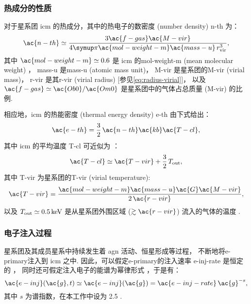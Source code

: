 \subsubsection{热成分的性质}

对于星系团 \ac{icm} 的热成分，其中的热电子的数密度 (number density) \ac{n-th} 为：
\begin{equation}
  \label{eq:n-th}
  \ac{n-th} \simeq
    \frac{3 \ac{f-gas} \ac{M-vir}}{
      4\Cpi \ac{mol-weight-m} \ac{mass-u} \,r^3_{\R{vir}}} ,
\end{equation}
其中
$\ac{mol-weight-m} \simeq 0.6$ 是 \ac{icm} 的\acl{mol-weight-m}
(mean molecular weight) \cite{ettori2013}，
\ac{mass-u} 是\acl{mass-u} (atomic mass unit)，
\ac{M-vir} 是星系团的\acl{M-vir} (virial mass)，
\ac{r-vir} 是其\acl{r-vir} (virial radius)
[参见\autoref{eq:radius-virial}]，
以及 $\ac{f-gas} \simeq \ac{Ob0}/\ac{Om0}$
是星系团中的气体占总质量 (\ac{M-vir}) 的比例.

相应地，\ac{icm} 的热能密度 (thermal energy density) \ac{e-th} 由下式给出：
\begin{equation}
  \label{eq:e-th}
  \ac{e-th} = \frac{3}{2} \,\ac{n-th} \ac{kb} \ac{T-cl} ,
\end{equation}
其中 \ac{icm} 的平均温度 \ac{T-cl} 可近似为 \cite{cavaliere1998}：
\begin{equation}
  \label{eq:t-icm}
  \ac{T-cl} \simeq \ac{T-vir} + \frac{3}{2} \,T_{\R{out}} ,
\end{equation}
其中 \ac{T-vir} 为星系团的\acl{T-vir} (virial temperature):
\begin{equation}
  \ac{T-vir} =
    \frac{\ac{mol-weight-m} \ac{mass-u} \ac{G} \ac{M-vir}}{2\,\ac{r-vir}} ,
\end{equation}
以及 $T_{\R{out}} \simeq \SI{0.5}{\keV}$
是从星系团外围区域 ($\gtrsim \ac{r-vir}$) 流入的气体的温度 \cite{fujita2003}.

\subsubsection{电子注入过程}

星系团及其成员星系中持续发生着 \ac{agn} 活动、恒星形成等过程，
不断地将\ac{e-primary}注入到 \ac{icm} 之中.
因此，可以假定\ac{e-primary}的注入速率 \ac{e-inj-rate} 是恒定的
\cite{cassano2005,donnert2014}，
同时还可假定注入电子的能谱为幂律形式 \cite{sarazin1999}，于是有：
\begin{equation}
  \label{eq:electron-inj}
  \ac{e-inj}(\ac{g}, t)
    \simeq \ac{e-inj}(\ac{g})
    = \ac{e-inj-rate} \,\ac{g}^{-s} ,
\end{equation}
其中 $s$ 为谱指数，在本工作中设为 2.5 \cite{cassano2005}.

